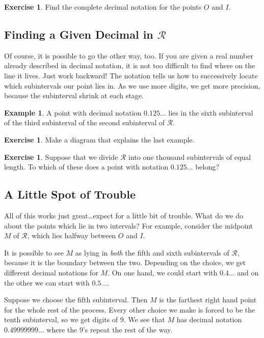 \documentclass[12pt,letterpaper]{article}
\theoremstyle{definition}
\newtheorem{example}{Example}
\newtheorem{exercise}[question]{Exercise}
\begin{document}
\begin{exercise}
Find the complete decimal notation for the points $O$ and $I$.
\end{exercise}


\subsection*{Finding a Given Decimal in $\mathcal{R}$}

Of course, it is possible to go the other way, too.
If you are given a real number already described in decimal notation, it is not too difficult to find where on the line it lives.
Just work backward!
The notation tells us how to successively locate which subintervals our point lies in.
As we use more digits, we get more precision, because the subinterval shrink at each stage.

\begin{example}
A point with decimal notation $0.125\ldots$ lies in the sixth subinterval of the third subinterval of the second subinterval of $\mathcal{R}$.
\end{example}

\begin{exercise}
Make a diagram that explains the last example.
\end{exercise}

\begin{exercise}
Suppose that we divide $\mathcal{R}$ into one thousand subintervals of equal length.
To which of these does a point with notation $0.125\ldots$ belong?
\end{exercise}



\subsection*{A Little Spot of Trouble}

All of this works just great\dots expect for a little bit of trouble.
What do we do about the points which lie in two intervals?
For example, consider the midpoint $M$ of $\mathcal{R}$, which lies halfway between $O$ and $I$.

It is possible to see $M$ as lying in \emph{both} the fifth and sixth subintervals of $\mathcal{R}$, because it is the boundary between the two.
Depending on the choice, we get different decimal notations for $M$.
On one hand, we could start with $0.4\ldots$ and on the other we can start with $0.5\ldots$.

Suppose we choose the fifth subinterval.
Then $M$ is the farthest right hand point for the whole rest of the process.
Every other choice we make is forced to be the tenth subinterval, so we get digits of $9$.
We see that $M$ has decimal notation $0.49999999\ldots$ where the $9$'s repeat the rest of the way.
\end{document}
